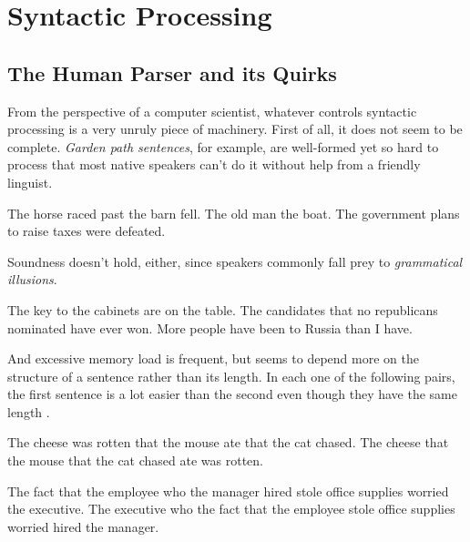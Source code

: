 \section{Syntactic Processing}
\label{sec:BigPicture_Processing}
\subsection{The Human Parser and its Quirks}
\label{sub:BigPicture_HumanParser}
From the perspective of a computer scientist, whatever controls syntactic processing is a very unruly piece of machinery.
First of all, it does not seem to be complete. 
\emph{Garden path sentences}, for example, are well-formed yet so hard to process that most native speakers can't do it without help from a friendly linguist.
%
\begin{exe}
    \ex
    \begin{xlist}
        \ex The horse raced past the barn fell.
        \ex The old man the boat.
        \ex The government plans to raise taxes were defeated.
    \end{xlist}
\end{exe}
%
Soundness doesn't hold, either, since speakers commonly fall prey to \emph{grammatical illusions}.
%
\begin{exe}
    \ex
    \begin{xlist}
        \ex The key to the cabinets are on the table.
        \ex The candidates that no republicans nominated have ever won.
        \ex More people have been to Russia than I have.
    \end{xlist}
\end{exe}
%
And excessive memory load is frequent, but seems to depend more on the structure of a sentence rather than its length.
In each one of the following pairs, the first sentence is a lot easier than the second even though they have the same length \citep[cf.][]{Gibson98, Resnik92}.
%
\begin{exe}
    \ex
    \begin{xlist}
        \ex The cheese was rotten that the mouse ate that the cat chased. 
        \ex The cheese that the mouse that the cat chased ate was rotten.
    \end{xlist}
    \ex
    \begin{xlist}
        \ex The fact that the employee who the manager hired stole office supplies worried the executive.
        \ex The executive who the fact that the employee stole office supplies worried hired the manager.
    \end{xlist}
\end{exe}

